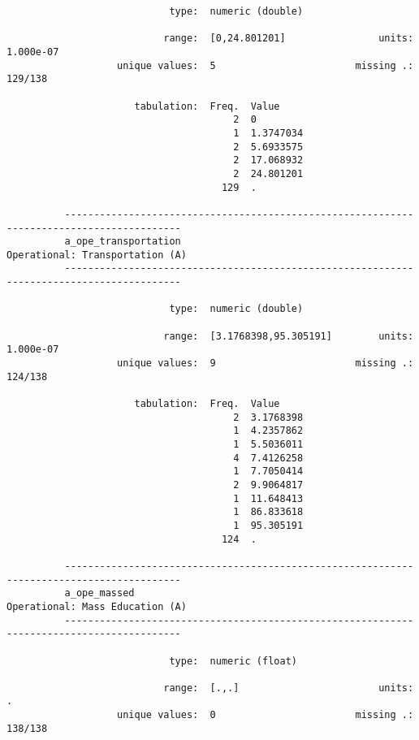 \documentclass{article}
\begin{document}
\begin{verbatim}
                            type:  numeric (double)
          
                           range:  [0,24.801201]                units:  1.000e-07
                   unique values:  5                        missing .:  129/138
          
                      tabulation:  Freq.  Value
                                       2  0
                                       1  1.3747034
                                       2  5.6933575
                                       2  17.068932
                                       2  24.801201
                                     129  .
          
          ------------------------------------------------------------------------------------------
          a_ope_transportation                                       Operational: Transportation (A)
          ------------------------------------------------------------------------------------------
          
                            type:  numeric (double)
          
                           range:  [3.1768398,95.305191]        units:  1.000e-07
                   unique values:  9                        missing .:  124/138
          
                      tabulation:  Freq.  Value
                                       2  3.1768398
                                       1  4.2357862
                                       1  5.5036011
                                       4  7.4126258
                                       1  7.7050414
                                       2  9.9064817
                                       1  11.648413
                                       1  86.833618
                                       1  95.305191
                                     124  .
          
          ------------------------------------------------------------------------------------------
          a_ope_massed                                               Operational: Mass Education (A)
          ------------------------------------------------------------------------------------------
          
                            type:  numeric (float)
          
                           range:  [.,.]                        units:  .
                   unique values:  0                        missing .:  138/138
          

\end{verbatim}
\end{document}
